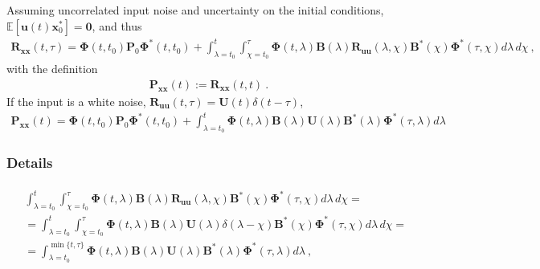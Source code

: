 \documentclass[letterpaper,10pt,english]{jupyterBook}
\begin{document}
\sphinxAtStartPar
Assuming uncorrelated input noise and uncertainty on the initial conditions, \(\mathbb{E}[ \mathbf{u}(t) \mathbf{x}^*_0 ] = \mathbf{0}\), and thus
\begin{equation*}
\begin{split}\mathbf{R}_{\mathbf{x}\mathbf{x}}(t, \tau) = \boldsymbol\Phi(t,t_0) \mathbf{P}_0 \boldsymbol\Phi^*(t,t_0) + \int_{\lambda=t_0}^{t} \int_{\chi=t_0}^{\tau}  \boldsymbol\Phi(t,\lambda) \mathbf{B}(\lambda) \mathbf{R}_{\mathbf{u}\mathbf{u}}(\lambda, \chi) \mathbf{B}^*(\chi) \boldsymbol\Phi^*(\tau,\chi)  d \lambda \, d \chi \ ,\end{split}
\end{equation*}
\sphinxAtStartPar
with the definition
\begin{equation*}
\begin{split}\mathbf{P}_{\mathbf{x}\mathbf{x}}(t) := \mathbf{R}_{\mathbf{x}\mathbf{x}}(t,t) \ .\end{split}
\end{equation*}
\sphinxAtStartPar
If the input is a white noise, \(\mathbf{R}_{\mathbf{u} \mathbf{u}}(t,\tau) = \mathbf{U}(t) \delta(t - \tau)\),
\begin{equation*}
\begin{split}\mathbf{P}_{\mathbf{x}\mathbf{x}}(t) = \boldsymbol\Phi(t,t_0) \mathbf{P}_0 \boldsymbol\Phi^*(t,t_0) + \int_{\lambda=t_0}^{t} \boldsymbol\Phi(t,\lambda) \mathbf{B}(\lambda) \mathbf{U}(\lambda) \mathbf{B}^*(\lambda) \boldsymbol\Phi^*(\tau,\lambda)  d \lambda \end{split}
\end{equation*}\subsubsection*{Details}
\begin{equation*}
\begin{split}\begin{aligned}
& \int_{\lambda=t_0}^{t} \int_{\chi=t_0}^{\tau}  \boldsymbol\Phi(t,\lambda) \mathbf{B}(\lambda) \mathbf{R}_{\mathbf{u}\mathbf{u}}(\lambda, \chi) \mathbf{B}^*(\chi) \boldsymbol\Phi^*(\tau,\chi)  d \lambda \, d \chi = \\
& = \int_{\lambda=t_0}^{t} \int_{\chi=t_0}^{\tau}  \boldsymbol\Phi(t,\lambda) \mathbf{B}(\lambda) \mathbf{U}(\lambda) \delta(\lambda-\chi) \mathbf{B}^*(\chi) \boldsymbol\Phi^*(\tau,\chi)  d \lambda \, d \chi = \\
& = \int_{\lambda=t_0}^{\min\{ t, \tau\}} \boldsymbol\Phi(t,\lambda) \mathbf{B}(\lambda) \mathbf{U}(\lambda) \mathbf{B}^*(\lambda) \boldsymbol\Phi^*(\tau,\lambda)  d \lambda \ ,
\end{aligned}\end{split}
\end{equation*}
\end{document}

